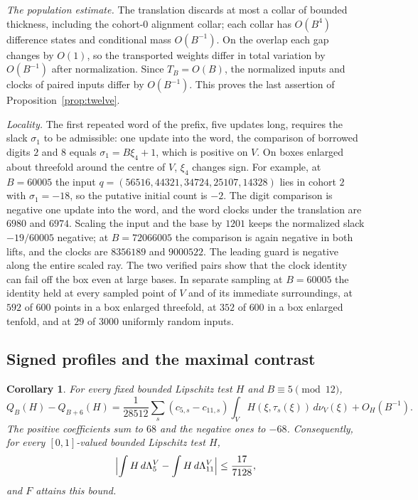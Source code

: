 \documentclass[11pt,reqno]{amsart}
\newtheorem{corollary}[theorem]{Corollary}
\theoremstyle{remark}
\begin{document}
\emph{The population estimate.} The translation discards at most a collar of bounded thickness, including the cohort-\(0\) alignment collar; each collar has \(O(B^4)\) difference states and conditional mass \(O(B^{-1})\). On the overlap each gap changes by \(O(1)\), so the transported weights differ in total variation by \(O(B^{-1})\) after normalization. Since \(T_B=O(B)\), the normalized inputs and clocks of paired inputs differ by \(O(B^{-1})\). This proves the last assertion of Proposition~\ref{prop:twelve}.

\emph{Locality.} The first repeated word of the prefix, five updates long, requires the slack \(\sigma_1\) to be admissible: one update into the word, the comparison of borrowed digits \(2\) and \(8\) equals \(\sigma_1=B\xi_4+1\), which is positive on \(V\). On boxes enlarged about threefold around the centre of \(V\), \(\xi_4\) changes sign. For example, at \(B=60005\) the input \(q=(56516,44321,34724,25107,14328)\) lies in cohort \(2\) with \(\sigma_1=-18\), so the putative initial count is \(-2\). The digit comparison is negative one update into the word, and the word clocks under the translation are \(6980\) and \(6974\). Scaling the input and the base by \(1201\) keeps the normalized slack \(-19/60005\) negative; at \(B=72066005\) the comparison is again negative in both lifts, and the clocks are \(8356189\) and \(9000522\). The leading guard is negative along the entire scaled ray. The two verified pairs show that the clock identity can fail off the box even at large bases. In separate sampling at \(B=60005\) the identity held at every sampled point of \(V\) and of its immediate surroundings, at \(592\) of \(600\) points in a box enlarged threefold, at \(352\) of \(600\) in a box enlarged tenfold, and at \(29\) of \(3000\) uniformly random inputs.

\subsection{Signed profiles and the maximal contrast}

\begin{corollary}\label{cor:maximal}
For every fixed bounded Lipschitz test \(H\) and \(B\equiv5\pmod{12}\),
\[
 Q_B(H)-Q_{B+6}(H)=\frac{1}{28512}\sum_s (c_{5,s}-c_{11,s})\int_V H(\xi,\tau_s(\xi))\,d\nu_V(\xi)+O_H(B^{-1}).
\]
The positive coefficients sum to \(68\) and the negative ones to \(-68\). Consequently, for every \([0,1]\)-valued bounded Lipschitz test \(H\),
\[
 \Bigl|\int H\,d\Lambda^V_5-\int H\,d\Lambda^V_{11}\Bigr|\le\frac{17}{7128},
\]
and \(F\) attains this bound.
\end{corollary}
\end{document}
